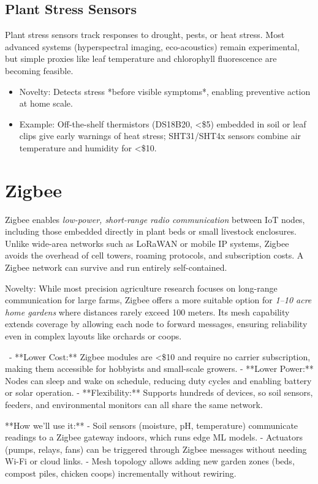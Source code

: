 \documentclass{sigchi}
\begin{document}
\subsection{Plant Stress Sensors}
Plant stress sensors track responses to drought, pests, or heat stress. Most advanced systems (hyperspectral imaging, eco-acoustics) remain experimental, but simple proxies like leaf temperature and chlorophyll fluorescence are becoming feasible.  
\begin{itemize}
	\item Novelty: Detects stress *before visible symptoms*, enabling preventive action at home scale.  
	\item Example: Off-the-shelf thermistors (DS18B20, <\$5) embedded in soil or leaf clips give early warnings of heat stress; SHT31/SHT4x sensors combine air temperature and humidity for <\$10.
\end{itemize}

\section{Zigbee}

Zigbee enables \emph{low-power, short-range radio communication} between IoT nodes, including those embedded directly in plant beds or small livestock enclosures. Unlike wide-area networks such as LoRaWAN or mobile IP systems, Zigbee avoids the overhead of cell towers, roaming protocols, and subscription costs. A Zigbee network can survive and run entirely self-contained.

Novelty: While most precision agriculture research focuses on long-range communication for large farms, Zigbee offers a more suitable option for \emph{1–10 acre home gardens} where distances rarely exceed 100 meters. Its mesh capability extends coverage by allowing each node to forward messages, ensuring reliability even in complex layouts like orchards or coops.

\
- **Lower Cost:** Zigbee modules are <\$10 and require no carrier subscription, making them accessible for hobbyists and small-scale growers.  
- **Lower Power:** Nodes can sleep and wake on schedule, reducing duty cycles and enabling battery or solar operation.  
- **Flexibility:** Supports hundreds of devices, so soil sensors, feeders, and environmental monitors can all share the same network.  

**How we’ll use it:**
- Soil sensors (moisture, pH, temperature) communicate readings to a Zigbee gateway indoors, which runs edge ML models.  
- Actuators (pumps, relays, fans) can be triggered through Zigbee messages without needing Wi-Fi or cloud links.  
- Mesh topology allows adding new garden zones (beds, compost piles, chicken coops) incrementally without rewiring.  
\end{document}
